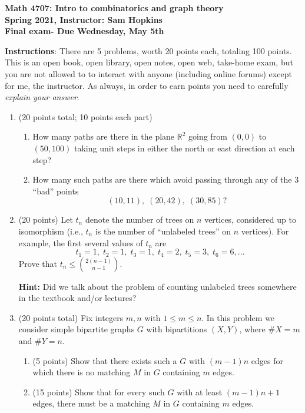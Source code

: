 \documentclass[11pt]{article}
\begin{document}
\begin{center}
{\bf Math 4707: Intro to combinatorics and graph theory \\
Spring 2021, Instructor: Sam Hopkins \\
Final exam- Due Wednesday, May 5th}
\end{center}

{\bf Instructions}: There are 5 problems, worth 20 points each, totaling 100 points. This is an open book, open library, open notes, open web, take-home exam, but you are not allowed to to interact with anyone (including online forums) except for me, the instructor. As always, in order to earn points you need to carefully \emph{explain your answer}.

\begin{enumerate}
\item (20 points total; 10 points each part) 
\begin{enumerate}
\item How many paths are there in the plane $\mathbb{R}^2$ going from $(0,0)$ to $(50,100)$ taking unit steps in either the north or east direction at each step?
\item How many such paths are there which avoid passing through any of the $3$ ``bad'' points
\[ (10,11), \; (20,42), \; (30, 85)?\]
\end{enumerate}

\item (20 points) Let $t_n$ denote the number of trees on $n$ vertices, considered up to isomorphism (i.e., $t_n$ is the number of ``unlabeled trees'' on $n$ vertices). For example, the first several values of $t_n$ are 
\[t_1=1, \; t_2=1, \; t_3=1, \; t_4=2, \; t_5=3, \; t_6=6,\ldots\]
Prove that $\displaystyle t_n \leq \binom{2(n-1)}{n-1}$. 

{\bf Hint:} Did we talk about the problem of counting unlabeled trees somewhere in the textbook and/or lectures?

\item (20 points total) Fix integers $m, n$ with $1 \leq m \leq n$. In this problem we consider simple bipartite graphs $G$ with bipartitions $(X,Y)$, where $\#X=m$ and $\#Y=n$.
\begin{enumerate}
\item (5 points) Show that there exists such a $G$ with $(m-1)n$ edges for which there is no matching $M$ in $G$ containing $m$ edges.
\item (15 points) Show that for every such $G$ with at least $(m-1)n + 1$ edges, there must be a matching $M$ in $G$ containing $m$ edges.
\end{enumerate}


\end{enumerate}
\end{document}
